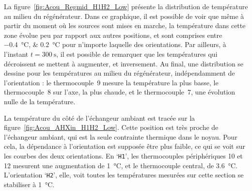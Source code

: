 %    

La figure~\ref{fig:Acou_Regmid_H1H2_Low} présente la distribution de température au milieu du régénérateur. Dans ce graphique, il est possible de voir que même à partir du moment où les sources sont mises en marche, la température dans cette zone évolue peu par rapport aux autres positions, et sont comprises entre \qtylist{-.4;.2}{\degreeCelsius} pour n'importe laquelle des orientations. Par ailleurs, à l'instant $t=\qty{300}{\second}$, il est possible de remarquer que les températures qui décroissent se mettent à augmenter, et inversement. Au final, une distribution se dessine pour les températures au milieu du régénérateur,  indépendamment de l'orientation : le thermocouple~9 mesure la température la plus basse, le thermocouple~8 sur l'axe, la plus chaude, et le thermocouple~7, une évolution nulle de la température. 

%    

La température du côté de l'échangeur ambiant est tracée sur la figure~\ref{fig:Acou_AHXin_H1H2_Low}. Cette position est très proche de l'échangeur ambiant, qui est la seule contrainte thermique dans le noyau. Pour cela, la dépendance à l'orientation est supposée être plus faible, ce qui se voit sur les courbes des deux orientations. En `\texttt{H1}', les thermocouples périphériques 10 et 12 mesurent une augmentation de \qty{1}{\degreeCelsius}, et le thermocouple central, de \qty{3.6}{\degreeCelsius}. L'orientation `\texttt{H2}', elle, voit toutes les températures mesurées sur cette section se stabiliser à \qty{1}{\degreeCelsius}. 

